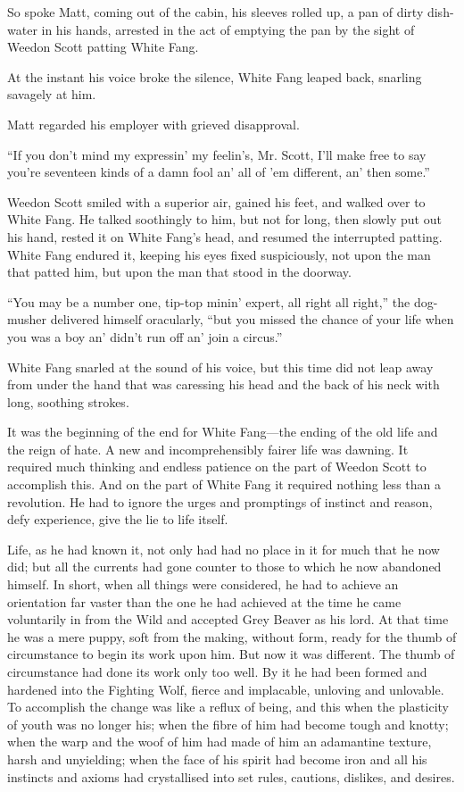 \documentclass[10pt]{book}
\begin{document}
So spoke Matt, coming out of the cabin, his sleeves rolled up, a pan of
dirty dish-water in his hands, arrested in the act of emptying the pan
by the sight of Weedon Scott patting White Fang.

At the instant his voice broke the silence, White Fang leaped back,
snarling savagely at him.

Matt regarded his employer with grieved disapproval.

“If you don’t mind my expressin’ my feelin’s, Mr. Scott, I’ll make free
to say you’re seventeen kinds of a damn fool an’ all of ’em different,
an’ then some.”

Weedon Scott smiled with a superior air, gained his feet, and walked
over to White Fang. He talked soothingly to him, but not for long, then
slowly put out his hand, rested it on White Fang’s head, and resumed
the interrupted patting. White Fang endured it, keeping his eyes fixed
suspiciously, not upon the man that patted him, but upon the man that
stood in the doorway.

“You may be a number one, tip-top minin’ expert, all right all right,”
the dog-musher delivered himself oracularly, “but you missed the chance
of your life when you was a boy an’ didn’t run off an’ join a circus.”

White Fang snarled at the sound of his voice, but this time did not
leap away from under the hand that was caressing his head and the back
of his neck with long, soothing strokes.

It was the beginning of the end for White Fang—the ending of the old
life and the reign of hate. A new and incomprehensibly fairer life was
dawning. It required much thinking and endless patience on the part of
Weedon Scott to accomplish this. And on the part of White Fang it
required nothing less than a revolution. He had to ignore the urges and
promptings of instinct and reason, defy experience, give the lie to
life itself.

Life, as he had known it, not only had had no place in it for much that
he now did; but all the currents had gone counter to those to which he
now abandoned himself. In short, when all things were considered, he
had to achieve an orientation far vaster than the one he had achieved
at the time he came voluntarily in from the Wild and accepted Grey
Beaver as his lord. At that time he was a mere puppy, soft from the
making, without form, ready for the thumb of circumstance to begin its
work upon him. But now it was different. The thumb of circumstance had
done its work only too well. By it he had been formed and hardened into
the Fighting Wolf, fierce and implacable, unloving and unlovable. To
accomplish the change was like a reflux of being, and this when the
plasticity of youth was no longer his; when the fibre of him had become
tough and knotty; when the warp and the woof of him had made of him an
adamantine texture, harsh and unyielding; when the face of his spirit
had become iron and all his instincts and axioms had crystallised into
set rules, cautions, dislikes, and desires.
\end{document}
